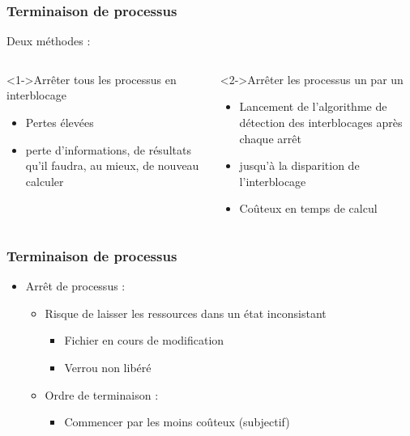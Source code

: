 \begin{frame}
\frametitle{Terminaison de processus}
Deux méthodes :
\begin{columns}
\begin{block}<1->{Arrêter tous les processus en interblocage}
\begin{itemize}
\item Pertes élevées
\item perte d’informations, de résultats qu’il faudra, au mieux, de nouveau calculer
\end{itemize}
\end{block}
\begin{block}<2->{Arrêter les processus un par un}
\begin{itemize}
\item Lancement de l’algorithme de détection des interblocages après chaque arrêt
\item jusqu’à la disparition de l’interblocage
\item Coûteux en temps de calcul
\end{itemize}
\end{block}
\end{columns}
\end{frame}

\begin{frame}
\frametitle{Terminaison de processus}
\begin{itemize}
\item Arrêt de processus :
\begin{itemize}
\item Risque de laisser les ressources dans un état inconsistant
\begin{itemize}
\item Fichier en cours de modification
\item Verrou non libéré
\end{itemize}
\item Ordre de terminaison :
\begin{itemize}
\item Commencer par les moins coûteux (subjectif)
\end{itemize}
\end{itemize}
\end{itemize}
\end{frame}


